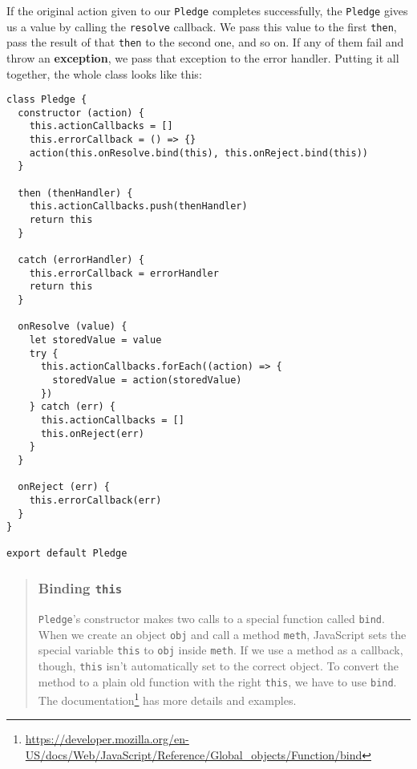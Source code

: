 \documentclass[krantzl]{krantz}
\newcommand{\glossref}[1]{\textbf{#1}}
\newenvironment{callout}{\savenotes\begin{tBox}\begin{quotation}\toggletrue{inbox}\renewcommand{\thempfootnote}{\arabic{footnote}}}{\end{quotation}\vspace{\baselineskip}\end{tBox}\togglefalse{inbox}\spewnotes}
\newcommand{\hreffoot}[2]{{#1}\footnote{\href{#2}{#2}}}
\begin{document}
If the original action given to our \texttt{Pledge} completes successfully,
the \texttt{Pledge} gives us a value by calling the \texttt{resolve} callback.
We pass this value to the first \texttt{then},
pass the result of that \texttt{then} to the second one,
and so on.
If any of them fail and throw an \glossref{exception},
we pass that exception to the error handler.
Putting it all together,
the whole class looks like this:


\begin{lstlisting}[frame=single,frameround=tttt]
class Pledge {
  constructor (action) {
    this.actionCallbacks = []
    this.errorCallback = () => {}
    action(this.onResolve.bind(this), this.onReject.bind(this))
  }

  then (thenHandler) {
    this.actionCallbacks.push(thenHandler)
    return this
  }

  catch (errorHandler) {
    this.errorCallback = errorHandler
    return this
  }

  onResolve (value) {
    let storedValue = value
    try {
      this.actionCallbacks.forEach((action) => {
        storedValue = action(storedValue)
      })
    } catch (err) {
      this.actionCallbacks = []
      this.onReject(err)
    }
  }

  onReject (err) {
    this.errorCallback(err)
  }
}

export default Pledge
\end{lstlisting}


\begin{callout}


\subsubsection*{Binding \texttt{this}}


\texttt{Pledge}'s constructor makes two calls to a special function called \texttt{bind}.
When we create an object \texttt{obj} and call a method \texttt{meth},
JavaScript sets the special variable \texttt{this} to \texttt{obj} inside \texttt{meth}.
If we use a method as a callback,
though,
\texttt{this} isn't automatically set to the correct object.
To convert the method to a plain old function with the right \texttt{this},
we have to use \texttt{bind}.
\hreffoot{The documentation}{https://developer.mozilla.org/en-US/docs/Web/JavaScript/Reference/Global\_objects/Function/bind} has more details and examples.

\end{callout}
\end{document}
